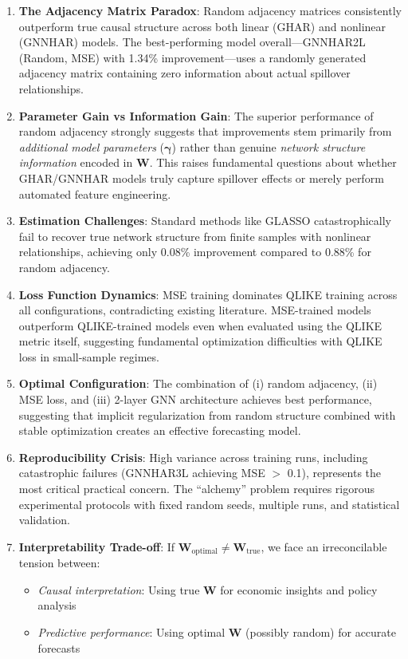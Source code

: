 \documentclass[10pt,a4paper]{article}
\begin{document}
\begin{enumerate}
\item \textbf{The Adjacency Matrix Paradox}: Random adjacency matrices consistently outperform true causal structure across both linear (GHAR) and nonlinear (GNNHAR) models. The best-performing model overall---GNNHAR2L (Random, MSE) with 1.34\% improvement---uses a randomly generated adjacency matrix containing zero information about actual spillover relationships.

\item \textbf{Parameter Gain vs Information Gain}: The superior performance of random adjacency strongly suggests that improvements stem primarily from \textit{additional model parameters} ($\boldsymbol{\gamma}$) rather than genuine \textit{network structure information} encoded in $\mathbf{W}$. This raises fundamental questions about whether GHAR/GNNHAR models truly capture spillover effects or merely perform automated feature engineering.

\item \textbf{Estimation Challenges}: Standard methods like GLASSO catastrophically fail to recover true network structure from finite samples with nonlinear relationships, achieving only 0.08\% improvement compared to 0.88\% for random adjacency.

\item \textbf{Loss Function Dynamics}: MSE training dominates QLIKE training across all configurations, contradicting existing literature. MSE-trained models outperform QLIKE-trained models even when evaluated using the QLIKE metric itself, suggesting fundamental optimization difficulties with QLIKE loss in small-sample regimes.

\item \textbf{Optimal Configuration}: The combination of (i) random adjacency, (ii) MSE loss, and (iii) 2-layer GNN architecture achieves best performance, suggesting that implicit regularization from random structure combined with stable optimization creates an effective forecasting model.

\item \textbf{Reproducibility Crisis}: High variance across training runs, including catastrophic failures (GNNHAR3L achieving MSE $>$ 0.1), represents the most critical practical concern. The ``alchemy'' problem requires rigorous experimental protocols with fixed random seeds, multiple runs, and statistical validation.

\item \textbf{Interpretability Trade-off}: If $\mathbf{W}_{\text{optimal}} \neq \mathbf{W}_{\text{true}}$, we face an irreconcilable tension between:
\begin{itemize}
\item \textit{Causal interpretation}: Using true $\mathbf{W}$ for economic insights and policy analysis
\item \textit{Predictive performance}: Using optimal $\mathbf{W}$ (possibly random) for accurate forecasts
\end{itemize}
\end{enumerate}
\end{document}
